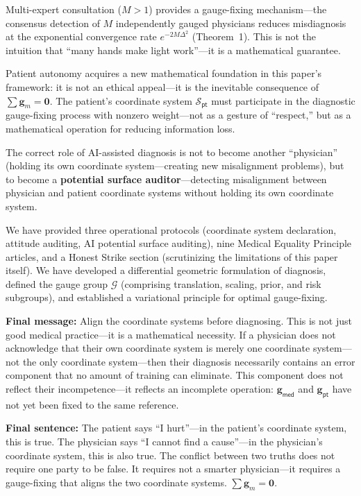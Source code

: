 \documentclass[12pt,a4paper]{article}
\theoremstyle{remark}
\newcommand{\G}{\mathcal{G}}
\newcommand{\med}{\textsf{med}}
\newcommand{\pt}{\textsf{pt}}
\begin{document}
Multi-expert consultation ($M > 1$) provides a gauge-fixing mechanism---the consensus detection of $M$ independently gauged physicians reduces misdiagnosis at the exponential convergence rate $e^{-2M\Delta^2}$ (Theorem~1). This is not the intuition that ``many hands make light work''---it is a mathematical guarantee.

Patient autonomy acquires a new mathematical foundation in this paper's framework: it is not an ethical appeal---it is the inevitable consequence of $\sum \mathbf{g}_m = \mathbf{0}$. The patient's coordinate system $\mathcal{S}_{\pt}$ must participate in the diagnostic gauge-fixing process with nonzero weight---not as a gesture of ``respect,'' but as a mathematical operation for reducing information loss.

The correct role of AI-assisted diagnosis is not to become another ``physician'' (holding its own coordinate system---creating new misalignment problems), but to become a \textbf{potential surface auditor}---detecting misalignment between physician and patient coordinate systems without holding its own coordinate system.

We have provided three operational protocols (coordinate system declaration, attitude auditing, AI potential surface auditing), nine Medical Equality Principle articles, and a Honest Strike section (scrutinizing the limitations of this paper itself). We have developed a differential geometric formulation of diagnosis, defined the gauge group $\G$ (comprising translation, scaling, prior, and risk subgroups), and established a variational principle for optimal gauge-fixing.

\textbf{Final message:} Align the coordinate systems before diagnosing. This is not just good medical practice---it is a mathematical necessity. If a physician does not acknowledge that their own coordinate system is merely one coordinate system---not the only coordinate system---then their diagnosis necessarily contains an error component that no amount of training can eliminate. This component does not reflect their incompetence---it reflects an incomplete operation: $\mathbf{g}_{\med}$ and $\mathbf{g}_{\pt}$ have not yet been fixed to the same reference.

\textbf{Final sentence:} The patient says ``I hurt''---in the patient's coordinate system, this is true. The physician says ``I cannot find a cause''---in the physician's coordinate system, this is also true. The conflict between two truths does not require one party to be false. It requires not a smarter physician---it requires a gauge-fixing that aligns the two coordinate systems. $\sum\mathbf{g}_m = \mathbf{0}$.
\end{document}
